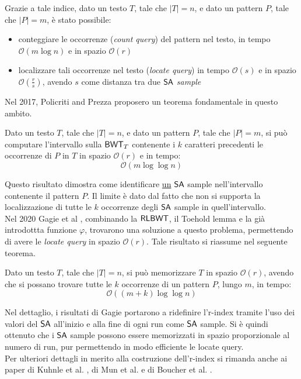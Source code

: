Grazie a tale indice, dato un testo $T$, tale che
$|T|=n$, e dato un pattern $P$, tale che $|P|=m$, è stato possibile: 
\begin{itemize}
  \item conteggiare le occorrenze (\textit{count query}) del pattern nel testo,
  in tempo $\mathcal{O}(m\log n)$ e in spazio $\mathcal{O}(r)$  
  \item localizzare tali occorrenze nel testo (\textit{locate query}) in tempo
  $\mathcal{O}(s)$ e in spazio $\mathcal{O}\left(\frac{r}{s}\right)$, avendo $s$
  come distanza tra due $\mbox{\rm {\sf SA}}$ \textit{sample}
\end{itemize}
Nel 2017, Policriti and Prezza \cite{policriti} proposero un teorema
fondamentale in questo ambito.
\begin{teorema}
  Dato un testo $T$, tale che $|T|=n$, e dato un pattern $P$, tale
  che $|P|=m$, si può computare l'intervallo sulla $\mbox{\rm {\sf BWT}}_T$ contenente i $k$
  caratteri precedenti le occorrenze di $P$ in $T$ in spazio $\mathcal{O}(r)$ e
  in tempo: 
  \begin{equation}
    \label{eq:rlbwt3}
    \mathcal{O}(m\log\log n)
  \end{equation}
\end{teorema}
Questo risultato dimostra come identificare \underline{un} $\mbox{\rm {\sf SA}}$ sample
nell'intervallo 
contenente il pattern $P$. Il limite è dato dal fatto che non si supporta la
localizzazione di tutte le $k$ occorrenze degli $\mbox{\rm {\sf SA}}$ sample in
quell'intervallo.\\
Nel 2020 Gagie et al \cite{gagie2020}, combinando la $\mbox{\rm {\sf RLBWT}}$, il
Toehold lemma e la già introdottta funzione $\varphi$, trovarono una soluzione a
questo problema, permettendo di avere le \textit{locate 
  query} in spazio $\mathcal{O}(r)$.
Tale risultato si riassume nel seguente teorema.
\begin{teorema}
  Dato un testo $T$, tale che $|T|=n$, si può memorizzare $T$ in spazio
  $\mathcal{O}(r)$, avendo che si possano trovare tutte le $k$ occorrenze di un
  pattern $P$, lungo $m$, in tempo:
  \begin{equation}
    \label{eq:rlbwt4}
    \mathcal{O}((m+k)\log\log n)
  \end{equation}
\end{teorema}
Nel dettaglio, i risultati di Gagie portarono a ridefinire l'r-index
tramite l'uso dei valori del $\mbox{\rm {\sf SA}}$ all'inizio e alla fine di ogni run come
$\mbox{\rm {\sf SA}}$ sample. Si è quindi ottenuto che i $\mbox{\rm {\sf SA}}$ sample possono
essere memorizzati in spazio proporzionale al numero di run, 
pur permettendo in modo efficiente le locate query.\\
Per ulteriori dettagli in merito alla costruzione dell'r-index si rimanda anche
ai 
paper di Kuhnle et al. \cite{kuhnle}, di Mun et al. \cite{mun} e di Boucher et
al. \cite{boucher}. 
